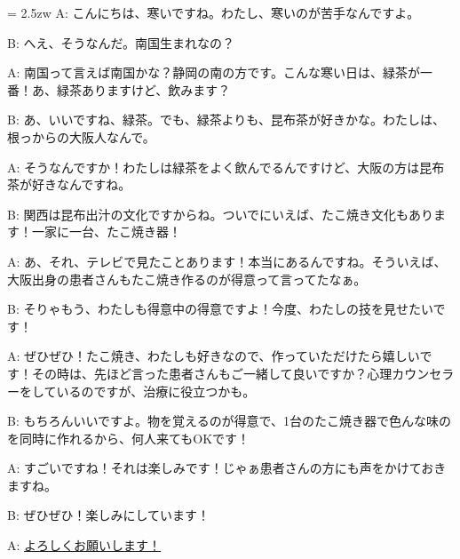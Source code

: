 \documentclass[11pt]{amsart}
\title{}
\author{}
\newenvironment{hangall}[1]{\hangindent = 2.5zw\everypar{\hangindent = 2.5zw}}{}
\begin{document}
\maketitle
\begin{hangall}{}%
A: こんにちは、寒いですね。わたし、寒いのが苦手なんですよ。

B: へえ、そうなんだ。南国生まれなの？

A: 南国って言えば南国かな？静岡の南の方です。こんな寒い日は、緑茶が一番！あ、緑茶ありますけど、飲みます？

B: あ、いいですね、緑茶。でも、緑茶よりも、昆布茶が好きかな。わたしは、根っからの大阪人なんで。

A: そうなんですか！わたしは緑茶をよく飲んでるんですけど、大阪の方は昆布茶が好きなんですね。

B: 関西は昆布出汁の文化ですからね。ついでにいえば、たこ焼き文化もあります！一家に一台、たこ焼き器！

A: あ、それ、テレビで見たことあります！本当にあるんですね。そういえば、大阪出身の患者さんもたこ焼き作るのが得意って言ってたなぁ。

B: そりゃもう、わたしも得意中の得意ですよ！今度、わたしの技を見せたいです！

A: ぜひぜひ！たこ焼き、わたしも好きなので、作っていただけたら嬉しいです！その時は、先ほど言った患者さんもご一緒して良いですか？心理カウンセラーをしているのですが、治療に役立つかも。

B: もちろんいいですよ。物を覚えるのが得意で、1台のたこ焼き器で色んな味のを同時に作れるから、何人来てもOKです！

A: すごいですね！それは楽しみです！じゃぁ患者さんの方にも声をかけておきますね。

B: ぜひぜひ！楽しみにしています！

A: \ul{よろしくお願いします！}\end{hangall}
\end{document}
